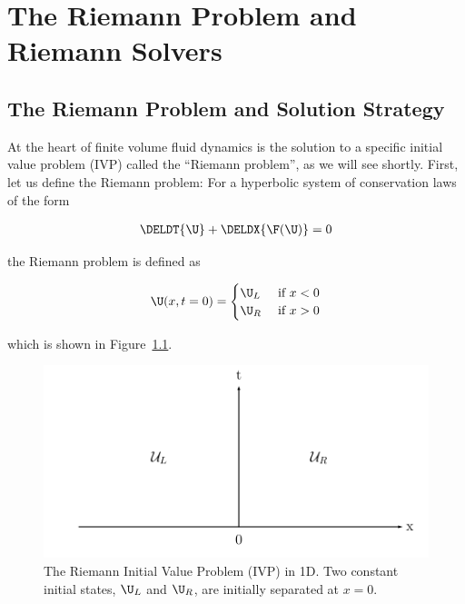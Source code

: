 \chapter{The Riemann Problem and Riemann Solvers} \label{chap:riemann}


\section{The Riemann Problem and Solution Strategy}

At the heart of finite volume fluid dynamics is the solution to a specific initial value problem
(IVP) called the ``Riemann problem'', as we will see shortly. First, let us define the Riemann
problem: For a hyperbolic system of conservation laws of the form

\begin{align}
	\DELDT{\U} + \DELDX{\F(\U)} = 0
\end{align}

the Riemann problem is defined as

\begin{align}
	\U(x, t=0) =
		\begin{cases}
			\U_L & \text{ if } x < 0\\
			\U_R & \text{ if } x > 0\\
		\end{cases}
\end{align}

which is shown in Figure~\ref{fig:riemann-problem}.

\begin{figure}[H]
\centering
\includegraphics[width=.6\linewidth]{./figures/FV/riemann_problem.pdf}%
\caption{
    The Riemann Initial Value Problem (IVP) in 1D. Two constant initial states, $\U_L$ and $\U_R$,
are initially separated at $x = 0$.
}
\label{fig:riemann-problem}
\end{figure}


